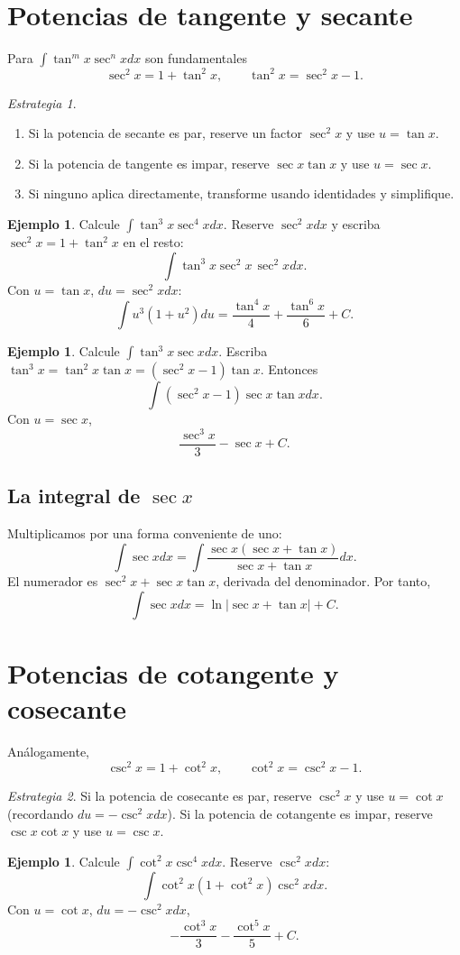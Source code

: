 \documentclass[12pt]{article}
\theoremstyle{definition}\newtheorem{definicion}[teorema]{Definición}\newtheorem{ejemplo}[teorema]{Ejemplo}\newtheorem{ejercicio}[teorema]{Ejercicio}
\theoremstyle{remark}\newtheorem*{observacion}{Observación}\newtheorem*{advertencia}{Advertencia}\newtheorem*{estrategia}{Estrategia}
\begin{document}
\section{Potencias de tangente y secante}
Para $\int\tan^m x\sec^n xdx$ son fundamentales
\[\sec^2x=1+\tan^2x,\qquad \tan^2x=\sec^2x-1.\]
\begin{estrategia}
\begin{enumerate}
\item Si la potencia de secante es par, reserve un factor $\sec^2x$ y use $u=\tan x$.
\item Si la potencia de tangente es impar, reserve $\sec x\tan x$ y use $u=\sec x$.
\item Si ninguno aplica directamente, transforme usando identidades y simplifique.
\end{enumerate}
\end{estrategia}
\begin{ejemplo}Calcule $\int\tan^3x\sec^4x dx$. Reserve $\sec^2x dx$ y escriba $\sec^2x=1+\tan^2x$ en el resto:
\[\int\tan^3x\sec^2x\,\sec^2x dx.\]
Con $u=\tan x$, $du=\sec^2x dx$:
\[\int u^3(1+u^2)du=\boxed{\frac{\tan^4x}{4}+\frac{\tan^6x}{6}+C}.\]\end{ejemplo}
\begin{ejemplo}Calcule $\int\tan^3x\sec xdx$. Escriba $\tan^3x=\tan^2x\tan x=(\sec^2x-1)\tan x$. Entonces
\[\int(\sec^2x-1)\sec x\tan xdx.\]
Con $u=\sec x$,
\[\boxed{\frac{\sec^3x}{3}-\sec x+C}.\]\end{ejemplo}
\subsection{La integral de $\sec x$}
Multiplicamos por una forma conveniente de uno:
\[\int\sec xdx=\int\frac{\sec x(\sec x+\tan x)}{\sec x+\tan x}dx.\]
El numerador es $\sec^2x+\sec x\tan x$, derivada del denominador. Por tanto,
\[\boxed{\int\sec xdx=\ln|\sec x+\tan x|+C}.\]

\section{Potencias de cotangente y cosecante}
Análogamente,
\[\csc^2x=1+\cot^2x,\qquad\cot^2x=\csc^2x-1.\]
\begin{estrategia}Si la potencia de cosecante es par, reserve $\csc^2x$ y use $u=\cot x$ (recordando $du=-\csc^2x dx$). Si la potencia de cotangente es impar, reserve $\csc x\cot x$ y use $u=\csc x$.\end{estrategia}
\begin{ejemplo}Calcule $\int\cot^2x\csc^4x dx$. Reserve $\csc^2x dx$:
\[\int\cot^2x(1+\cot^2x)\csc^2x dx.\]
Con $u=\cot x$, $du=-\csc^2x dx$,
\[\boxed{-\frac{\cot^3x}{3}-\frac{\cot^5x}{5}+C}.\]\end{ejemplo}
\end{document}
